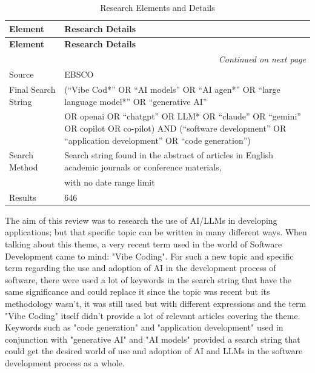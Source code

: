 {\small
\centering

\begin{longtable}{p{2.8cm} p{12.2cm}}
\caption{Research Elements and Details}
\label{tab:review_protocol} \\
\toprule
\textbf{Element} & \textbf{Research Details} \\
\midrule
\endfirsthead

\toprule
\textbf{Element} & \textbf{Research Details} \\
\midrule
\endhead

\midrule
\multicolumn{2}{r}{\textit{Continued on next page}} \\
\midrule
\endfoot

\bottomrule
\endlastfoot

Source & EBSCO \\

Final Search String &
(``Vibe Cod*'' OR ``AI models'' OR ``AI agen*'' OR ``large language model*'' OR ``generative AI'' \\
 & OR openai OR ``chatgpt'' OR LLM* OR ``claude'' OR ``gemini'' OR copilot OR co-pilot) AND (``software development'' OR ``application development'' OR ``code generation'') \\

Search Method & Search string found in the abstract of articles in English academic journals or conference materials, \\
 & with no date range limit \\

Results & 646 \\

\end{longtable}
}


The aim of this review was to research the use of AI/LLMs in developing applications; but that specific topic can be written in many different ways. When talking about this theme, a very recent term used in the world of Software Development came to mind: "Vibe Coding". For such a new topic and specific term regarding the use and adoption of AI in the development process of software, there were used a lot of keywords in the search string that have the same significance and could replace it since the topic was recent but its methodology wasn't, it was still used but with different expressions and the term "Vibe Coding" itself didn't provide a lot of relevant articles covering the theme. Keywords such as "code generation" and "application development" used in conjunction with "generative AI" and "AI models" provided a search string that could get the desired world of use and adoption of AI and LLMs in the software development process as a whole.

